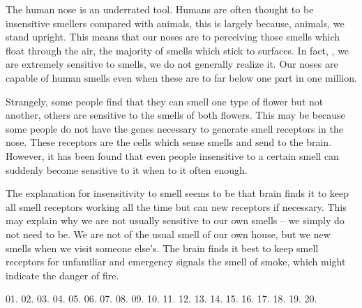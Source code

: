 \qquad The human nose is an underrated tool. Humans are often thought to be insensitive smellers compared with animals, \underline{\quad} this is largely because, \underline{\quad} animals, we stand upright. This means that our noses are \underline{\quad} to perceiving those smells which float through the air, \underline{\quad} the majority of smells which stick to surfaces. In fact, \underline{\quad}, we are extremely sensitive to smells, \underline{\quad} we do not generally realize it. Our noses are capable of \underline{\quad} human smells even when these are \underline{\quad} to far below one part in one million.

\qquad Strangely, some people find that they can smell one type of flower but not another, \underline{\quad} others are sensitive to the smells of both flowers. This may be because some people do not have the genes necessary to generate \underline{\quad} smell receptors in the nose. These receptors are the cells which sense smells and send \underline{\quad} to the brain. However, it has been found that even people insensitive to a certain smell \underline{\quad} can suddenly become sensitive to it when \underline{\quad} to it often enough.

\qquad The explanation for insensitivity to smell seems to be that brain finds it \underline{\quad} to keep all smell receptors working all the time but can \underline{\quad} new receptors if necessary. This may \underline{\quad} explain why we are not usually sensitive to our own smells -- we simply do not need to be. We are not \underline{\quad} of the usual smell of our own house, but we \underline{\quad} new smells when we visit someone else's. The brain finds it best to keep smell receptors \underline{\quad} for unfamiliar and emergency signals \underline{\quad} the smell of smoke, which might indicate the danger of fire.

\vspace{6pt}

01. 
02. 
03. 
04. 
05. 
06. 
07. 
08. 
09. 
10. 
11. 
12. 
13. 
14. 
15. 
16. 
17. 
18. 
19. 
20. 
